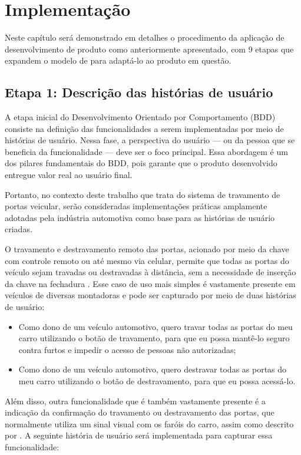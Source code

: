 \chapter{Implementação} \label{ch:IM}

Neste capítulo será demonstrado em detalhes o procedimento da aplicação de desenvolvimento de produto como anteriormente apresentado, 
com 9 etapas que expandem o modelo de \cite{Lawrence2019cucumber} para adaptá-lo ao produto em questão.

\section{Etapa 1: Descrição das histórias de usuário}
A etapa inicial do Desenvolvimento Orientado por Comportamento (BDD) consiste na definição das funcionalidades a serem implementadas por meio de histórias de usuário. 
Nessa fase, a perspectiva do usuário — ou da pessoa que se beneficia da funcionalidade — deve ser o foco principal. Essa abordagem é um dos pilares fundamentais do BDD, 
pois garante que o produto desenvolvido entregue valor real ao usuário final.

Portanto, no contexto deste trabalho que trata do sistema de travamento de portas veicular, serão consideradas implementações práticas amplamente adotadas pela 
indústria automotiva como base para as histórias de usuário criadas.

O travamento e destravamento remoto das portas, acionado por meio da chave com controle remoto ou até mesmo via celular, permite que todas as portas do veículo sejam 
travadas ou destravadas à distância, sem a necessidade de inserção da chave na fechadura \cite{bosch2022handbook}. Esse caso de uso mais simples é vastamente presente 
em veículos de diversas montadoras e pode ser capturado por meio de duas histórias de usuário:

\begin{itemize}
    \item Como dono de um veículo automotivo, quero travar todas as portas do meu carro utilizando o botão de travamento, para que eu possa mantê-lo seguro contra furtos e impedir o acesso de pessoas não autorizadas;
    \item Como dono de um veículo automotivo, quero destravar todas as portas do meu carro utilizando o botão de destravamento, para que eu possa acessá-lo.
\end{itemize}

Além disso, outra funcionalidade que é também vastamente presente é a indicação da confirmação do travamento ou destravamento das portas, que normalmente utiliza um 
sinal visual com os faróis do carro, assim como descrito por \cite{vwLocking}. A seguinte história de usuário será implementada para capturar essa funcionalidade:

